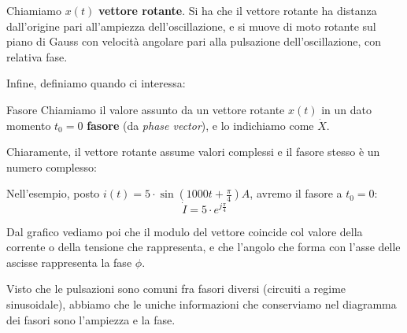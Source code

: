 \documentclass[a4paper,11pt]{article}
\begin{document}
\par\medskip

Chiamiamo $x(t)$ \textbf{vettore rotante}.
Si ha che il vettore rotante ha distanza dall'origine pari all'ampiezza dell'oscillazione, e si muove di moto rotante sul piano di Gauss con velocità angolare pari alla pulsazione dell'oscillazione, con relativa fase.

Infine, definiamo quando ci interessa:
\begin{definition}{Fasore}
Chiamiamo il valore assunto da un vettore rotante $x(t)$ in un dato momento $t_0 = 0$ \textbf{fasore} (da \textit{phase vector}), e lo indichiamo come $\dot{X}$.
\end{definition}
Chiaramente, il vettore rotante assume valori complessi e il fasore stesso è un numero complesso:

\begin{center}
\end{center}

Nell'esempio, posto $i(t) = 5 \cdot \sin (1000 t + \frac{\pi}{4})A$, avremo il fasore a $t_0 = 0$:
$$
\dot{I} = 5 \cdot e^{j \frac{\pi}{4}}
$$

Dal grafico vediamo poi che il modulo del vettore coincide col valore della corrente o della tensione che rappresenta, e che l'angolo che forma con l'asse delle ascisse rappresenta la fase $\phi$.

Visto che le pulsazioni sono comuni fra fasori diversi (circuiti a regime sinusoidale), abbiamo che le uniche informazioni che conserviamo nel diagramma dei fasori sono l'ampiezza e la fase.
\end{document}
